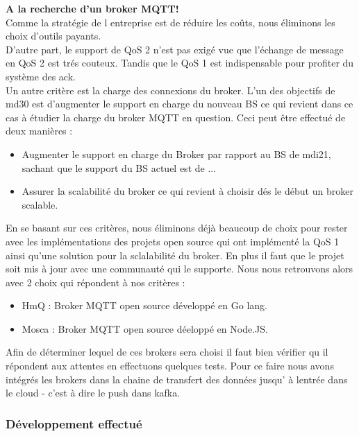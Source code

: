         {\centering
        \Large
        \textbf{A la recherche d'un broker MQTT! } \\}
        \vspace{0.2cm}
        Comme la stratégie de l entreprise est de réduire les coûts, nous éliminons les choix d'outils payants. \\
        D'autre part, le support de QoS 2 n'est pas exigé vue que l'échange de message en QoS 2 est trés couteux. 
        Tandis que le QoS 1 est indispensable pour profiter du système des ack.\\
        Un autre critère est la charge des connexions du broker. L'un des objectifs de \gls{md30} est d'augmenter le support 
        en charge du nouveau BS ce qui revient dans ce cas à étudier la charge du broker MQTT en question. 
        Ceci peut être effectué de deux manières : 
        \begin{itemize}
            \item Augmenter le support en charge du Broker par rapport au \gls{BS} de \gls{mdi21}, sachant que
            le support du BS actuel est de ... 
            \item Assurer la scalabilité du broker ce qui revient à choisir dés le début un broker scalable.
        \end{itemize} 
        \vspace{0.3cm}
        En se basant sur ces critères, nous éliminons déjà beaucoup de choix pour rester avec les implémentations des projets 
        open source qui ont implémenté la QoS 1 ainsi qu'une solution pour la sclalabilité du broker. En plus il faut que le projet soit mis 
        à jour avec une communauté qui le supporte.  
        Nous nous retrouvons alors avec 2 choix qui répondent à nos critères : 
        \begin{itemize}
            \item HmQ : Broker MQTT open source développé en Go lang. 
            \item Mosca : Broker MQTT open source déeloppé en Node.JS. 
        \end{itemize} 
        
        Afin de déterminer lequel de ces brokers sera choisi il faut bien vérifier qu il répondent aux attentes en effectuons quelques tests. 
        Pour ce faire nous avons intégrés les brokers dans la chaine de transfert des données jusqu' à lentrée dans le cloud - 
        c'est à dire le push dans kafka.


        \subsubsection{Développement effectué}

